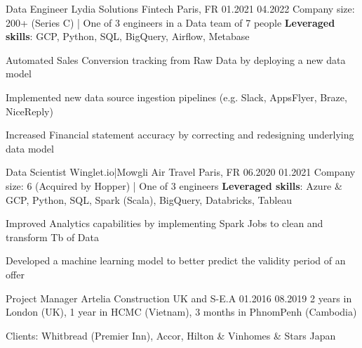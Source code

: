 \begin{cventries}
\cventry
{Data Engineer} %
{Lydia Solutions} %
{Fintech} %
{Paris, FR} %
{01.2021} %
{04.2022} %
{Company size: 200+ (Series C) | One of 3 engineers in a Data team of 7 people} %
{\textbf{Leveraged skills}: GCP, Python, SQL, BigQuery, Airflow, Metabase} %
{
  \begin{cvitems} %
    \item {Automated Sales Conversion tracking from Raw Data by deploying a new data model}
    \item {Implemented new data source ingestion pipelines (e.g. Slack, AppsFlyer, Braze, NiceReply)}
    \item {Increased Financial statement accuracy by correcting and redesigning underlying data model}
  \end{cvitems}
}

  \cventry
    {Data Scientist} %
    {Winglet.io|Mowgli} %
    {Air Travel} %
    {Paris, FR} %
    {06.2020} %
    {01.2021} %
    {Company size: 6 (Acquired by Hopper) | One of 3 engineers  } %
    {\textbf{Leveraged skills}: Azure \& GCP, Python, SQL, Spark (Scala), BigQuery, Databricks, Tableau} %
    {
      \begin{cvitems} %
       \item {Improved Analytics capabilities by implementing Spark Jobs to clean and transform Tb of Data}
       \item {Developed a machine learning model to better predict the validity period of an offer}
      \end{cvitems}
    }

  \cventry
    {Project Manager} %
    {Artelia} %
    {Construction}%
    {UK and S-E.A} %
    {01.2016} %
    {08.2019} %
    {2 years in London (UK), 1 year in HCMC (Vietnam), 3 months in PhnomPenh (Cambodia) } %
    {} %
    {
      \begin{cvitems} %
        \item {Clients: Whitbread (Premier Inn), Accor, Hilton \& Vinhomes \& Stars Japan} 
      \end{cvitems}
    }

\end{cventries}

